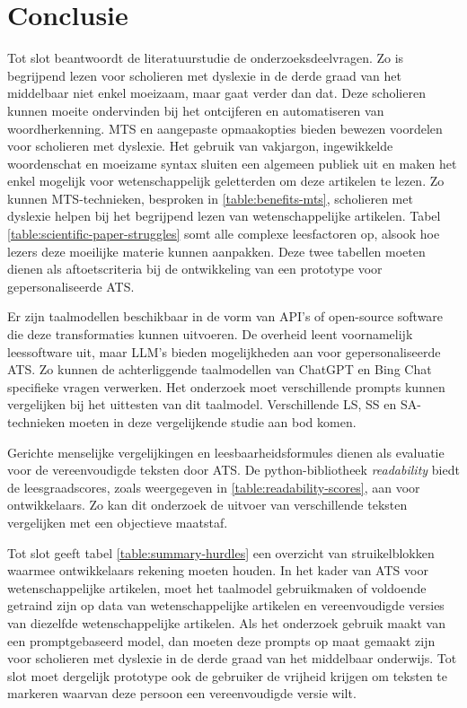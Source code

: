 \section{Conclusie}

Tot slot beantwoordt de literatuurstudie de onderzoeksdeelvragen. Zo is begrijpend lezen voor scholieren met dyslexie in de derde graad van het middelbaar niet enkel moeizaam, maar gaat verder dan dat. Deze scholieren kunnen moeite ondervinden bij het ontcijferen en automatiseren van woordherkenning. MTS en aangepaste opmaakopties bieden bewezen voordelen voor scholieren met dyslexie. Het gebruik van vakjargon, ingewikkelde woordenschat en moeizame syntax sluiten een algemeen publiek uit en maken het enkel mogelijk voor wetenschappelijk geletterden om deze artikelen te lezen. Zo kunnen MTS-technieken, besproken in \ref{table:benefits-mts}, scholieren met dyslexie helpen bij het begrijpend lezen van wetenschappelijke artikelen. Tabel \ref{table:scientific-paper-struggles} somt alle complexe leesfactoren op, alsook hoe lezers deze moeilijke materie kunnen aanpakken. Deze twee tabellen moeten dienen als aftoetscriteria bij de ontwikkeling van een prototype voor gepersonaliseerde ATS. 

\medspace

Er zijn taalmodellen beschikbaar in de vorm van API's of open-source software die deze transformaties kunnen uitvoeren. De overheid leent voornamelijk leessoftware uit, maar LLM's bieden mogelijkheden aan voor gepersonaliseerde ATS. Zo kunnen de achterliggende taalmodellen van ChatGPT en Bing Chat specifieke vragen verwerken. Het onderzoek moet verschillende prompts kunnen vergelijken bij het uittesten van dit taalmodel. Verschillende LS, SS en SA-technieken moeten in deze vergelijkende studie aan bod komen. 

\medspace

Gerichte menselijke vergelijkingen en leesbaarheidsformules dienen als evaluatie voor de vereenvoudigde teksten door ATS. De python-bibliotheek \textit{readability} biedt de leesgraadscores, zoals weergegeven in \ref{table:readability-scores}, aan voor ontwikkelaars. Zo kan dit onderzoek de uitvoer van verschillende teksten vergelijken met een objectieve maatstaf.

\medspace

Tot slot geeft tabel \ref{table:summary-hurdles} een overzicht van struikelblokken waarmee ontwikkelaars rekening moeten houden. In het kader van ATS voor wetenschappelijke artikelen, moet het taalmodel gebruikmaken of voldoende getraind zijn op data van wetenschappelijke artikelen en vereenvoudigde versies van diezelfde wetenschappelijke artikelen. Als het onderzoek gebruik maakt van een promptgebaseerd model, dan moeten deze prompts op maat gemaakt zijn voor scholieren met dyslexie in de derde graad van het middelbaar onderwijs. Tot slot moet dergelijk prototype ook de gebruiker de vrijheid krijgen om teksten te markeren waarvan deze persoon een vereenvoudigde versie wilt.
